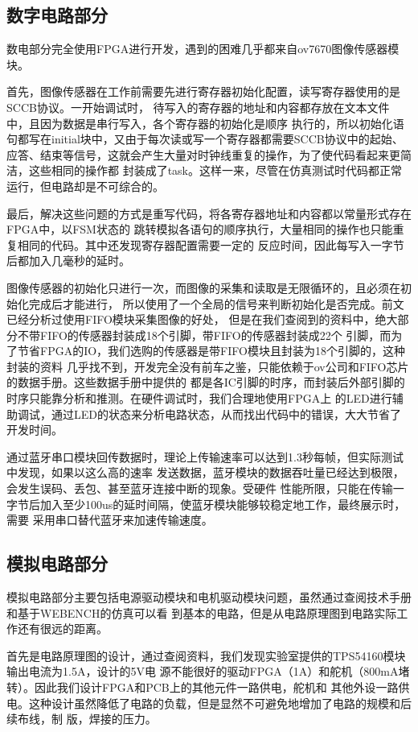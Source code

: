 \documentclass[a4paper]{paper}
\begin{document}
\subsection{数字电路部分}
数电部分完全使用FPGA进行开发，遇到的困难几乎都来自ov7670图像传感器模块。

首先，图像传感器在工作前需要先进行寄存器初始化配置，读写寄存器使用的是SCCB协议。一开始调试时，
待写入的寄存器的地址和内容都存放在文本文件中，且因为数据是串行写入，各个寄存器的初始化是顺序
执行的，所以初始化语句都写在initial块中，又由于每次读或写一个寄存器都需要SCCB协议中的起始、
应答、结束等信号，这就会产生大量对时钟线重复的操作，为了使代码看起来更简洁，这些相同的操作都
封装成了task。这样一来，尽管在仿真测试时代码都正常运行，但电路却是不可综合的。

最后，解决这些问题的方式是重写代码，将各寄存器地址和内容都以常量形式存在FPGA中，以FSM状态的
跳转模拟各语句的顺序执行，大量相同的操作也只能重复相同的代码。其中还发现寄存器配置需要一定的
反应时间，因此每写入一字节后都加入几毫秒的延时。

图像传感器的初始化只进行一次，而图像的采集和读取是无限循环的，且必须在初始化完成后才能进行，
所以使用了一个全局的信号来判断初始化是否完成。前文已经分析过使用FIFO模块采集图像的好处，
但是在我们查阅到的资料中，绝大部分不带FIFO的传感器封装成18个引脚，带FIFO的传感器封装成22个
引脚，而为了节省FPGA的IO，我们选购的传感器是带FIFO模块且封装为18个引脚的，这种封装的资料
几乎找不到，开发完全没有前车之鉴，只能依赖于ov公司和FIFO芯片的数据手册。这些数据手册中提供的
都是各IC引脚的时序，而封装后外部引脚的时序只能靠分析和推测。在硬件调试时，我们合理地使用FPGA上
的LED进行辅助调试，通过LED的状态来分析电路状态，从而找出代码中的错误，大大节省了开发时间。

通过蓝牙串口模块回传数据时，理论上传输速率可以达到1.3秒每帧，但实际测试中发现，如果以这么高的速率
发送数据，蓝牙模块的数据吞吐量已经达到极限，会发生误码、丢包、甚至蓝牙连接中断的现象。受硬件
性能所限，只能在传输一字节后加入至少100us的延时间隔，使蓝牙模块能够较稳定地工作，最终展示时，需要
采用串口替代蓝牙来加速传输速度。
\subsection{模拟电路部分}
模拟电路部分主要包括电源驱动模块和电机驱动模块问题，虽然通过查阅技术手册和基于WEBENCH的仿真可以看
到基本的电路，但是从电路原理图到电路实际工作还有很远的距离。

首先是电路原理图的设计，通过查阅资料，我们发现实验室提供的TPS54160模块输出电流为1.5A，设计的5V电
源不能很好的驱动FPGA（1A）和舵机（800mA堵转）。因此我们设计FPGA和PCB上的其他元件一路供电，舵机和
其他外设一路供电。这种设计虽然降低了电路的负载，但是显然不可避免地增加了电路的规模和后续布线，制
版，焊接的压力。
\end{document}
